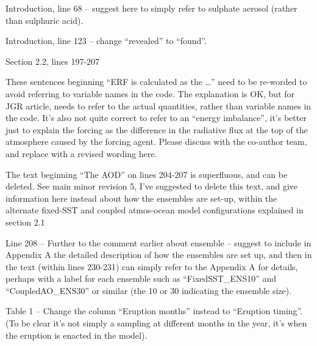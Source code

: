 \documentclass{reviewresponse}
\begin{document}
  \begin{revresponse}[Fixed.]
  \end{revresponse}
  \begin{revcomment}[after title={: O9},colframe={colorcommentresolved}]
    Introduction, line 68 -- suggest here to simply refer to sulphate aerosol (rather
    than sulphuric acid).
  \end{revcomment}
  \begin{revcomment}[after title={: O10}]
    Introduction, line 123 -- change ``revealed'' to ``found''.
  \end{revcomment}
  \begin{revresponse}[Fixed.]
  \end{revresponse}
  \begin{revcomment}[after title={: O11},colframe={colorcommentresolved}]
    Section 2.2, lines 197-207

    These sentences beginning ``ERF is calculated as the \ldots'' need to be re-worded
    to avoid referring to variable names in the code. The explanation is OK, but for JGR
    article, needs to refer to the actual quantities, rather than variable names in the
    code. It's also not quite correct to refer to an ``energy imbalance'', it's better
    just to explain the forcing as the difference in the radiative flux at the top of
    the atmosphere caused by the forcing agent. Please discuss with the co-author team,
    and replace with a revised wording here.

    The text beginning ``The AOD'' on lines 204-207 is superfluous, and can be deleted.
    See main minor revision 5, I've suggested to delete this text, and give information
    here instead about how the ensembles are set-up, within the alternate fixed-SST and
    coupled atmos-ocean model configurations explained in section 2.1
  \end{revcomment}
  \begin{revcomment}[after title={: O12},colframe={colorcommentresolved}]
    Line 208 -- Further to the comment earlier about ensemble -- suggest to include in
    Appendix A the detailed description of how the ensembles are set up, and then in the
    text (within lines 230-231) can simply refer to the Appendix A for details, perhaps
    with a label for each ensemble such as ``FixedSST\_ENS10'' and ``CoupledAO\_ENS30''
    or similar (the 10 or 30 indicating the ensemble size).
  \end{revcomment}
  \begin{revcomment}[after title={: O13},colframe={colorcommentresolved}]
    Table 1 -- Change the column ``Eruption months'' instead to ``Eruption timing''. (To
    be clear it's not simply a sampling at different months in the year, it's when the
    eruption is enacted in the model).
  \end{revcomment}
\end{document}
